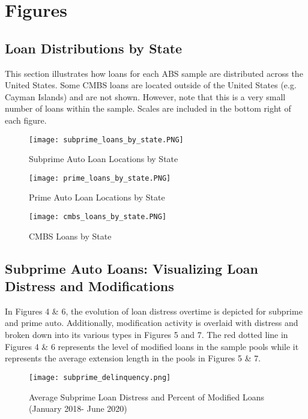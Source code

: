 \documentclass[10.5pt]{article}
\begin{document}
\newpage
\section{Figures}

\subsection{Loan Distributions by State}

This section illustrates how loans for each ABS sample are distributed across the United States. Some CMBS loans are located outside of the United States (e.g. Cayman Islands) and are not shown. However, note that this is a very small number of loans within the sample. Scales are included in the bottom right of each figure. 

\begin{figure}[H] 
\caption{Subprime Auto Loan Locations by State}
\centering 
\texttt{[image: subprime\_loans\_by\_state.PNG]}
\end{figure}

\begin{figure}[H] 
\caption{Prime Auto Loan Locations by State}
\centering 
\texttt{[image: prime\_loans\_by\_state.PNG]}
\end{figure}
\newpage 

\begin{figure}[H] 
\caption{CMBS Loans by State}
\centering 
\texttt{[image: cmbs\_loans\_by\_state.PNG]}
\end{figure}
\newpage 


\subsection{Subprime Auto Loans: Visualizing Loan Distress and Modifications}

In Figures 4 \& 6, the evolution of loan distress overtime is depicted for subprime and prime auto. Additionally, modification activity is overlaid with distress and broken down into its various types in Figures 5 and 7. The red dotted line in Figures 4 \& 6 represents the level of modified loans in the sample pools while it represents the average extension length in the pools in Figures 5 \& 7.

\begin{figure}[H] 
\caption{Average Subprime Loan Distress and Percent of Modified Loans (January 2018- June 2020)}
\centering 
\texttt{[image: subprime\_delinquency.png]}
\end{figure}
\end{document}
